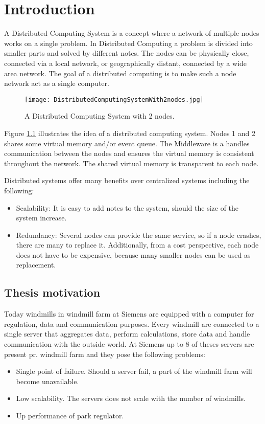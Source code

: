 \chapter{Introduction}

A Distributed Computing System is a concept where a network of multiple nodes works on a single problem. In Distributed Computing a problem is divided into smaller parts and solved by different notes. The nodes can be physically close, connected via a local network, or geographically distant, connected by a wide area network. The goal of a distributed computing is to make such a node network act as a single computer.

\begin{figure}
	\centering
	\texttt{[image: DistributedComputingSystemWith2nodes.jpg]} 
	\caption[Distributed Computing System with 2 nodes]{
		\label{fig:distributedCoputingSystem} 
		\footnotesize{%
			A Distributed Computing System with 2 nodes.
		}
	}
\end{figure}

Figure \cref{fig:distributedCoputingSystem} illustrates the idea of a distributed computing system. Nodes 1 and 2 shares some virtual memory and/or event queue. The Middleware is a handles communication between the nodes and ensures the virtual memory is consistent throughout the network. The shared virtual memory is transparent to each node. 

Distributed systems offer many benefits over centralized systems including the following:
\begin{itemize}
	\item Scalability: It is easy to add notes to the system, should the size of the system increase.
	\item Redundancy: Several nodes can provide the same service, so if a node crashes, there are many to replace it. Additionally, from a cost perspective, each node does not have to be expensive, because many smaller nodes can be used as replacement.
\end{itemize}

\section{Thesis motivation}
Today windmills in windmill farm at Siemens are equipped with a computer for regulation, data and communication purposes. Every windmill are connected to a single server that aggregates data, perform calculations, store data and handle communication with the outside world. At Siemens up to 8 of theses servers are present pr. windmill farm and they pose the following problems:
\begin{itemize} 
	\item Single point of failure. Should a server fail, a part of the windmill farm will become unavailable.
	\item Low scalability. The servers does not scale with the number of windmills.
	\item Up performance of park regulator.
\end{itemize}

